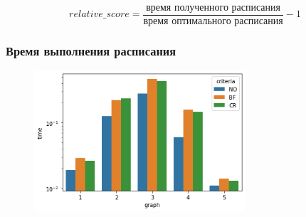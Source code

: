 \begin{frame}
    \begin{equation*}
        relative\_score = \frac{\text{время полученного расписания}}{\text{время оптимального расписания}} - 1
    \end{equation*}
\end{frame}

\begin{frame}
    \frametitle{Время выполнения расписания}
    \begin{figure}
        \includegraphics[width=0.7\textwidth]{imgs/times.png}
    \end{figure}
\end{frame}